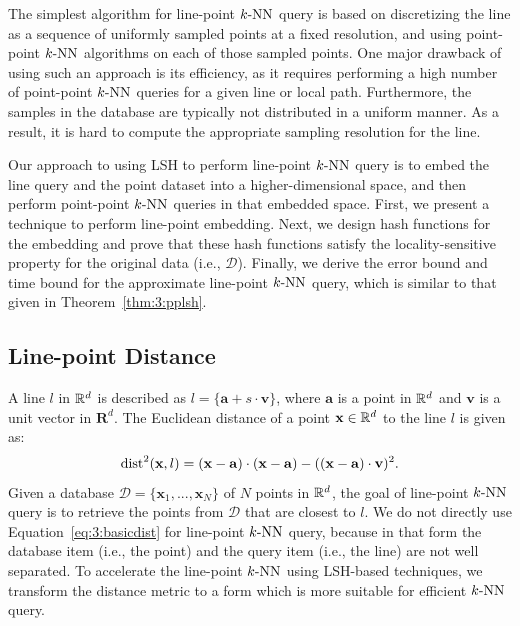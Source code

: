 The simplest algorithm for line-point $k\text{-NN}$ query is based on discretizing the line as a sequence of uniformly sampled points at a fixed resolution, and using point-point $k\text{-NN}$ algorithms on each of those sampled points. One major drawback of using such an approach is its efficiency, as it requires performing a high number of point-point $k\text{-NN}$ queries for a given line or local path. Furthermore, the samples in the database are typically not distributed in a uniform manner. As a result, it is hard to compute the appropriate sampling resolution for the line.

Our approach to using LSH to perform line-point $k\text{-NN}$ query is to embed the line query and the point dataset into a higher-dimensional space, and then perform point-point $k\text{-NN}$ queries in that embedded space. First, we present a technique to perform line-point embedding. Next, we design hash functions for the embedding and prove that these hash functions satisfy the locality-sensitive property for the original data (i.e., $\mathcal D$). Finally, we derive the error bound and time bound for the approximate line-point $k\text{-NN}$ query, which is similar to that given in Theorem~\ref{thm:3:pplsh}.

\subsection{Line-point Distance}
A line $l$ in $\mathbb R^d$ is described as $l = \{\mathbf a + s \cdot \mathbf v\}$, where $\mathbf a$ is a point in $\mathbb R^d$ and $\mathbf v$ is a unit vector in $\mathbf R^d$.
The Euclidean distance of a point $\mathbf x \in \mathbb R^d$ to the line $l$ is given as:
\begin{equation}
\label{eq:3:basicdist}
  \operatorname{dist}^2(\mathbf x, l) = (\mathbf x - \mathbf a) \cdot (\mathbf x - \mathbf a) - ((\mathbf x - \mathbf a) \cdot \mathbf v)^2.
\end{equation}
Given a database $\mathcal D = \{\mathbf x_1, ..., \mathbf x_N\}$ of $N$ points in $\mathbb R^d$, the goal of line-point $k\text{-NN}$ query is to retrieve the points from $\mathcal D$ that are closest to $l$. We do not directly use Equation~\ref{eq:3:basicdist} for line-point $k\text{-NN}$ query, because in that form the database item (i.e., the point) and the query item (i.e., the line) are not well separated. To accelerate the line-point $k\text{-NN}$ using LSH-based techniques, we transform the distance metric to a form which is more suitable for efficient $k\text{-NN}$ query.

